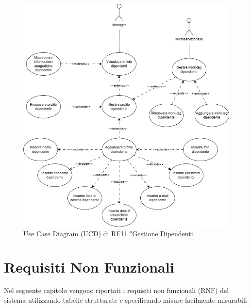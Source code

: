 \documentclass{report}
\begin{document}
\begin{figure}[H]
	\centering\includegraphics[width=1\textwidth]{images/UCD/RF11_gestionedipendenti_UCD.png}
	Use Case Diagram (UCD) di RF11 "Gestione Dipendenti
\end{figure}

\pagebreak

\section{Requisiti Non Funzionali}
Nel seguente capitolo vengono riportati i requisiti non funzionali (RNF) del sistema utilizzando tabelle strutturate e specificando misure facilmente misurabili
\end{document}
